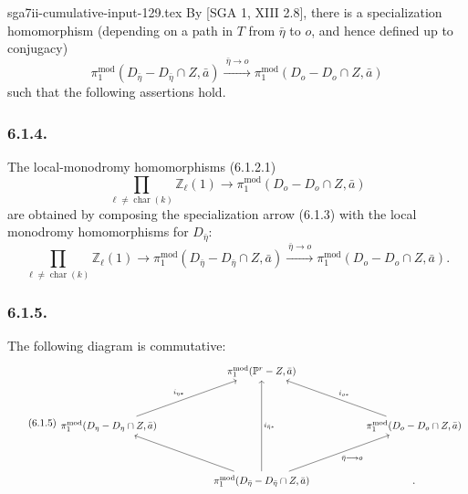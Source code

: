 \begin{filecontents*}{sga7ii-cumulative-input-129.tex}
By [SGA 1, XIII 2.8], there is a specialization homomorphism (depending on
a path in $T$ from $\bar\eta$ to $o$, and hence defined up to conjugacy)
\begin{equation}\tag{6.1.3}
\pi_1^{\mathrm{mod}}(D_{\bar\eta}-D_{\bar\eta}\cap Z,\bar a)
\xrightarrow{\ \bar\eta\longrightarrow o\ }
\pi_1^{\mathrm{mod}}(D_o-D_o\cap Z,\bar a)
\end{equation}
such that the following assertions hold.

\subsubsection*{6.1.4.}
The local-monodromy homomorphisms (6.1.2.1)
\[
\prod_{\ell\ne\operatorname{char}(k)}\mathbb Z_\ell(1)
\longrightarrow
\pi_1^{\mathrm{mod}}(D_o-D_o\cap Z,\bar a)
\]
are obtained by composing the specialization arrow (6.1.3) with the local
monodromy homomorphisms for $D_{\bar\eta}$:
\begin{equation}\tag{6.1.4.1}
\prod_{\ell\ne\operatorname{char}(k)}\mathbb Z_\ell(1)
\longrightarrow
\pi_1^{\mathrm{mod}}(D_{\bar\eta}-D_{\bar\eta}\cap Z,\bar a)
\xrightarrow{\ \bar\eta\longrightarrow o\ }
\pi_1^{\mathrm{mod}}(D_o-D_o\cap Z,\bar a).
\end{equation}

\subsubsection*{6.1.5.}
The following diagram is commutative:
\begin{equation}\tag{6.1.5}
\begin{tikzcd}[column sep=huge,row sep=huge]
{} & \pi_1^{\mathrm{mod}}(\mathbb P^r-Z,\bar a) & {} \\
\pi_1^{\mathrm{mod}}(D_\eta-D_\eta\cap Z,\bar a)
  \arrow[ur,"i_{\eta*}"]
& {}
& \pi_1^{\mathrm{mod}}(D_o-D_o\cap Z,\bar a)
  \arrow[ul,"i_{o*}"'] \\
{} & \pi_1^{\mathrm{mod}}(D_{\bar\eta}-D_{\bar\eta}\cap Z,\bar a)
  \arrow[uu,"i_{\bar\eta*}"']
  \arrow[ul]
  \arrow[ur,"\bar\eta\longrightarrow o"'] & {} .
\end{tikzcd}
\end{equation}


\end{filecontents*}
